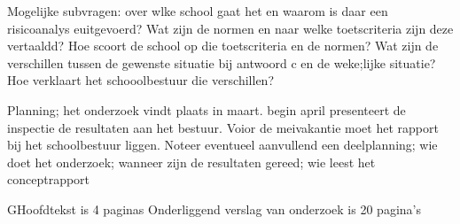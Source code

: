 			
			Mogelijke subvragen:
			over wlke school gaat het en waarom is daar een risicoanalys euitgevoerd?
			Wat zijn de normen en naar welke toetscriteria zijn deze vertaaldd?
			Hoe scoort de school op die toetscriteria en de normen?
			Wat zijn de verschillen tussen de gewenste situatie bij antwoord c en de weke;lijke situatie?
			Hoe  verklaart het schooolbestuur die verschillen?
			
			Planning;
			het onderzoek vindt plaats in maart. begin april presenteert de inspectie de resultaten aan het bestuur. Voior de meivakantie moet  het rapport bij het schoolbestuur liggen. Noteer eventueel aanvullend een deelplanning; wie doet het onderzoek; wanneer zijn de resultaten gereed; wie leest het conceptrapport
			
			GHoofdtekst is 4 paginas
			Onderliggend verslag van onderzoek is 20 pagina's
			
			
			\appendix
			
			
			
			
			
			
			
			
